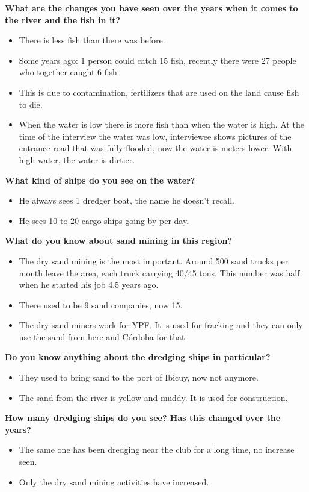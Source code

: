 \newpage
\textbf{What are the changes you have seen over the years when it comes to the river and the fish in it?}
\begin{itemize}
    \item There is less fish than there was before.
    \item Some years ago: 1 person could catch 15 fish, recently there were 27 people who together caught 6 fish.
    \item This is due to contamination, fertilizers that are used on the land cause fish to die.
    \item When the water is low there is more fish than when the water is high. At the time of the interview the water was low, interviewee shows pictures of the entrance road that was fully flooded, now the water is meters lower. With high water, the water is dirtier.
\end{itemize}

\textbf{What kind of ships do you see on the water?}
\begin{itemize}
    \item He always sees 1 dredger boat, the name he doesn't recall.
    \item He sees 10 to 20 cargo ships going by per day.
\end{itemize}

\textbf{What do you know about sand mining in this region?}
\begin{itemize}
    \item The dry sand mining is the most important. Around 500 sand trucks per month leave the area, each truck carrying 40/45 tons. This number was half when he started his job 4.5 years ago.
    \item There used to be 9 sand companies, now 15.
    \item The dry sand miners work for YPF. It is used for fracking and they can only use the sand from here and Córdoba for that.
\end{itemize}

\textbf{Do you know anything about the dredging ships in particular?}
\begin{itemize}
    \item They used to bring sand to the port of Ibicuy, now not anymore.
    \item The sand from the river is yellow and muddy. It is used for construction.
\end{itemize}

\textbf{How many dredging ships do you see? Has this changed over the years? }
\begin{itemize}
    \item The same one has been dredging near the club for a long time, no increase seen.
    \item Only the dry sand mining activities have increased.
\end{itemize}

